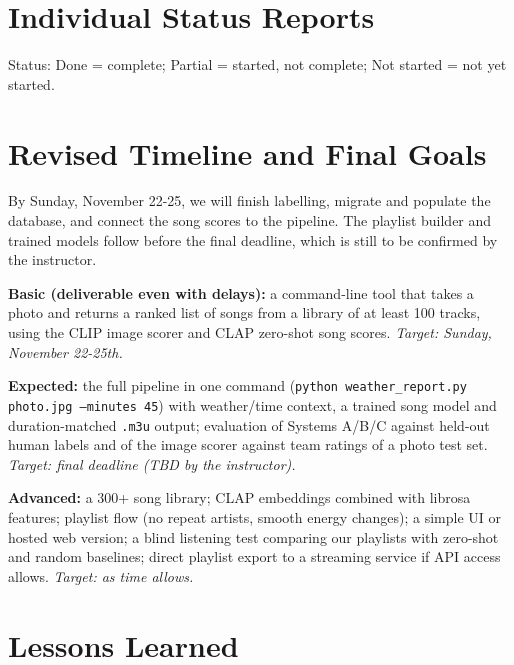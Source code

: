 \documentclass{article}
\newcommand{\stDone}{Done}
\newcommand{\stPart}{Partial}
\newcommand{\stNone}{Not started}
\begin{document}
\section{Individual Status Reports}\label{sec:status}

Status: \stDone{} = complete; \stPart{} = started, not complete;
\stNone{} = not yet started.





\section{Revised Timeline and Final Goals}\label{sec:plan}

By Sunday, November 22-25, we will finish labelling, migrate and populate
the database, and connect the song scores to the pipeline. The playlist builder
and trained models follow before the final deadline, which is still to be
confirmed by the instructor.

\textbf{Basic (deliverable even with delays):} a command-line tool that takes
a photo and returns a ranked list of songs from a library of at least 100
tracks, using the CLIP image scorer and CLAP zero-shot song scores.
\emph{Target: Sunday, November 22-25th.}

\textbf{Expected:} the full pipeline in one command
(\texttt{python weather\_report.py photo.jpg --minutes 45}) with weather/time
context, a trained song model and duration-matched \texttt{.m3u} output;
evaluation of Systems A/B/C against held-out human labels and of the image
scorer against team ratings of a photo test set.
\emph{Target: final deadline (TBD by the instructor).}

\textbf{Advanced:} a 300+ song library; CLAP embeddings combined with librosa
features; playlist flow (no repeat artists, smooth energy changes); a simple UI
or hosted web version; a blind listening test comparing our playlists with
zero-shot and random baselines; direct playlist export to a streaming service
if API access allows. \emph{Target: as time allows.}

\section{Lessons Learned}\label{sec:lessons}
\end{document}
